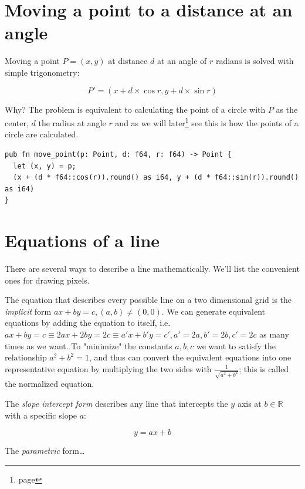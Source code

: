 \documentclass[12pt,openany,a4,usenames,dvipsnames]{book}
\newcommand\pixels{{\pixelfont{}pixels}}
\begin{document}
\chapter{Moving a point to a distance at an angle}

Moving a point $P=(x,y)$ at distance $d$ at an angle of $r$ radians is solved with simple trigonometry:

$$P'=(x+d\times{}\cos{}r, y+d\times{}\sin{}r)$$

Why? The problem is equivalent to calculating the point of a circle with $P$ as the center, $d$ the radius at angle $r$ and as we will later\footnote{\emph{} page \pageref{sec:equations-circles}} see this is how the points of a circle are calculated.

\begin{verbatim}
pub fn move_point(p: Point, d: f64, r: f64) -> Point {
  let (x, y) = p;
  (x + (d * f64::cos(r)).round() as i64, y + (d * f64::sin(r)).round() as i64)
}
\end{verbatim}

\chapter{Equations of a line}\label{ch:equations-lines}
There are several ways to describe a line mathematically. We'll list the convenient ones for drawing \pixels{}.

The equation that describes every possible line on a two dimensional grid is the \emph{implicit} form $ax+by=c, (a,b) \neq{} (0,0)$. We can generate equivalent equations by adding the equation to itself, i.e.\ $ax+by=c \equiv 2ax+2by=2c \equiv a'x+b'y=c', a'=2a, b'=2b, c'=2c$ as many times as we want. To "minimize" the constants $a,b,c$ we want to satisfy the relationship $a^{2}+b^{2}=1$, and thus can convert the equivalent equations into one representative equation by multiplying the two sides with $\frac{1}{\sqrt{a^2+b^2}}$; this is called the normalized equation. %

The \emph{slope intercept form} describes any line that intercepts the $y$ axis at $b \in{} \mathbb{R}$ with a specific slope $a$:

$$y=ax+b$$

The \emph{parametric} form\ldots{} %
\end{document}
